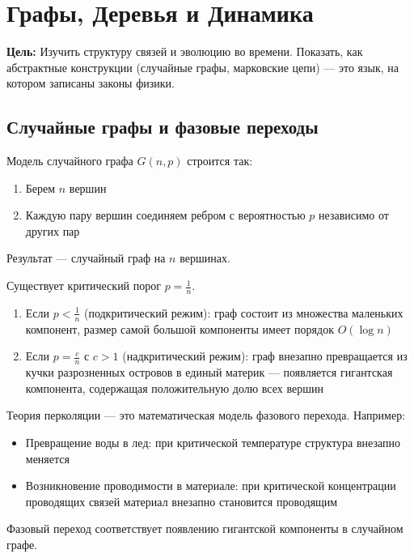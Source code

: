 \documentclass[11pt, a4paper]{extarticle}
\begin{document}
\newpage

\section{Графы, Деревья и Динамика}
\textbf{Цель:} Изучить структуру связей и эволюцию во времени. Показать, как абстрактные конструкции (случайные графы, марковские цепи) --- это язык, на котором записаны законы физики.

\subsection{Случайные графы и фазовые переходы}

\begin{definition}
Модель случайного графа $G(n, p)$ строится так:
\begin{enumerate}
    \item Берем $n$ вершин
    \item Каждую пару вершин соединяем ребром с вероятностью $p$ независимо от других пар
\end{enumerate}
Результат --- случайный граф на $n$ вершинах.
\end{definition}

\begin{theorem}
Существует критический порог $p = \frac{1}{n}$. 
\begin{enumerate}
    \item Если $p < \frac{1}{n}$ (подкритический режим): граф состоит из множества маленьких компонент, размер самой большой компоненты имеет порядок $O(\log n)$
    \item Если $p = \frac{c}{n}$ с $c > 1$ (надкритический режим): граф внезапно превращается из кучки разрозненных островов в единый материк --- появляется гигантская компонента, содержащая положительную долю всех вершин
\end{enumerate}
\end{theorem}

\begin{remark}
Теория перколяции --- это математическая модель фазового перехода. Например:
\begin{itemize}
    \item Превращение воды в лед: при критической температуре структура внезапно меняется
    \item Возникновение проводимости в материале: при критической концентрации проводящих связей материал внезапно становится проводящим
\end{itemize}
Фазовый переход соответствует появлению гигантской компоненты в случайном графе.
\end{remark}
\end{document}
